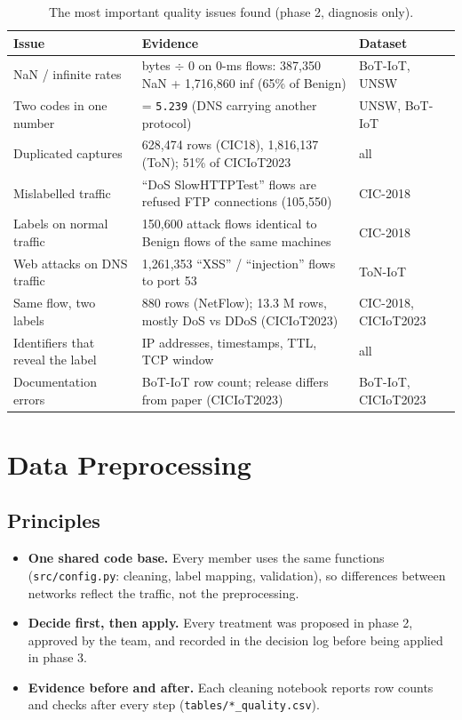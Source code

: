 \documentclass[12pt,a4paper]{article}
\newcommand{\var}[1]{\texttt{\detokenize{#1}}}
\begin{document}
\begin{table}[!htbp]\centering\small
\caption{The most important quality issues found (phase 2, diagnosis only).}\label{tab:issues}
\begin{tabular}{L{4.4cm}L{6.2cm}L{3.8cm}}
\toprule
Issue & Evidence & Dataset \\
\midrule
NaN / infinite rates & bytes $\div$ 0 on 0-ms flows: 387,350 NaN + 1,716,860 inf (65\% of Benign) & BoT-IoT, UNSW \\
Two codes in one number & \var{L7_PROTO} = \texttt{5.239} (DNS carrying another protocol) & UNSW, BoT-IoT \\
Duplicated captures & 628,474 rows (CIC18), 1,816,137 (ToN); 51\% of CICIoT2023 & all \\
Mislabelled traffic & ``DoS SlowHTTPTest'' flows are refused FTP connections (105,550) & CIC-2018 \\
Labels on normal traffic & 150,600 attack flows identical to Benign flows of the same machines & CIC-2018 \\
Web attacks on DNS traffic & 1,261,353 ``XSS'' / ``injection'' flows to port 53 & ToN-IoT \\
Same flow, two labels & 880 rows (NetFlow); 13.3 M rows, mostly DoS vs DDoS (CICIoT2023) & CIC-2018, CICIoT2023 \\
Identifiers that reveal the label & IP addresses, timestamps, TTL, TCP window & all \\
Documentation errors & BoT-IoT row count; release differs from paper (CICIoT2023) & BoT-IoT, CICIoT2023 \\
\bottomrule
\end{tabular}
\end{table}



\section{Data Preprocessing}

\subsection{Principles}
\begin{itemize}
  \item \textbf{One shared code base.} Every member uses the same functions (\texttt{src/config.py}: cleaning, label
        mapping, validation), so differences between networks reflect the traffic, not the preprocessing.
  \item \textbf{Decide first, then apply.} Every treatment was proposed in phase 2, approved by the team, and recorded
        in the decision log before being applied in phase 3.
  \item \textbf{Evidence before and after.} Each cleaning notebook reports row counts and checks after every step
        (\texttt{tables/*\_quality.csv}).
\end{itemize}
\end{document}
